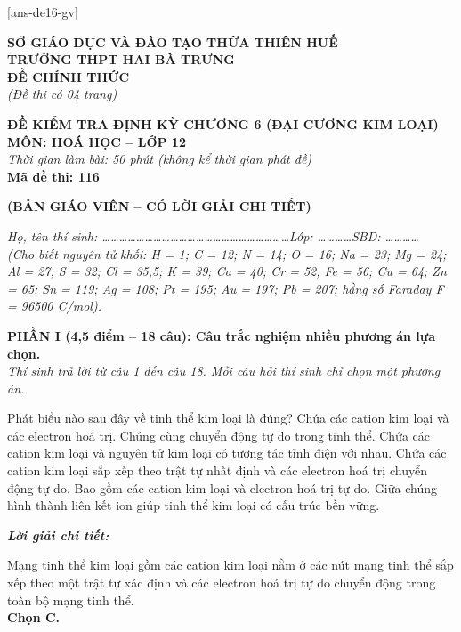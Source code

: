 \documentclass[11pt,a4paper]{article}
\def\loigiai#1{
\par\begingroup\color{blue!80!black}\small
\noindent\textbf{\textit{Lời giải chi tiết:}}\par
#1\par\endgroup}
\begin{document}
[ans-de16-gv]

\noindent
\begin{minipage}[t]{0.48\textwidth}
	\textbf{SỞ GIÁO DỤC VÀ ĐÀO TẠO THỪA THIÊN HUẾ}\\
	\textbf{TRƯỜNG THPT HAI BÀ TRƯNG}\\
	\textbf{ĐỀ CHÍNH THỨC}\\
	\textit{(Đề thi có 04 trang)}
\end{minipage}\hfill
\begin{minipage}[t]{0.48\textwidth}
	\raggedleft
	\textbf{\color{mainGreen}ĐỀ KIỂM TRA ĐỊNH KỲ CHƯƠNG 6 (ĐẠI CƯƠNG KIM LOẠI)}\\
	\textbf{MÔN: HOÁ HỌC -- LỚP 12}\\
	\textit{Thời gian làm bài: 50 phút (không kể thời gian phát đề)}\\
	\textbf{Mã đề thi: 116}
\end{minipage}


\vspace{0.1cm}
\begin{center}
	\textbf{\color{hfRed}\Large (BẢN GIÁO VIÊN -- CÓ LỜI GIẢI CHI TIẾT)}
\end{center}

\vspace{1pt}
\noindent\textit{Họ, tên thí sinh: \dots\dots\dots\dots\dots\dots\dots\dots\dots\dots\dots\dots\dots\dots\dots\dots\dots\dots\dots\dots\dots\dots Lớp: \dots\dots\dots\dots SBD: \dots\dots\dots\dots}\\
\noindent\textit{(Cho biết nguyên tử khối: H = 1; C = 12; N = 14; O = 16; Na = 23; Mg = 24; Al = 27; S = 32; Cl = 35,5; K = 39; Ca = 40; Cr = 52; Fe = 56; Cu = 64; Zn = 65; Sn = 119; Ag = 108; Pt = 195; Au = 197; Pb = 207; hằng số Faraday F = 96500 C/mol).}

\vspace{2pt}
\noindent
\textbf{PHẦN I (4,5 điểm -- 18 câu): Câu trắc nghiệm nhiều phương án lựa chọn.}\\
\textit{Thí sinh trả lời từ câu 1 đến câu 18. Mỗi câu hỏi thí sinh chỉ chọn một phương án.}

\setcounter{ex}{0}

\begin{ex}
Phát biểu nào sau đây về tinh thể kim loại là đúng?
\choice
{Chứa các cation kim loại và các electron hoá trị. Chúng cùng chuyển động tự do trong tinh thể.}
{Chứa các cation kim loại và nguyên tử kim loại có tương tác tĩnh điện với nhau.}
{\True Chứa các cation kim loại sắp xếp theo trật tự nhất định và các electron hoá trị chuyển động tự do.}
{Bao gồm các cation kim loại và electron hoá trị tự do. Giữa chúng hình thành liên kết ion giúp tinh thể kim loại có cấu trúc bền vững.}
\loigiai{
Mạng tinh thể kim loại gồm các cation kim loại nằm ở các nút mạng tinh thể sắp xếp theo một trật tự xác định và các electron hoá trị tự do chuyển động trong toàn bộ mạng tinh thể.\\
\textbf{Chọn C.}}
\end{ex}
\end{document}
